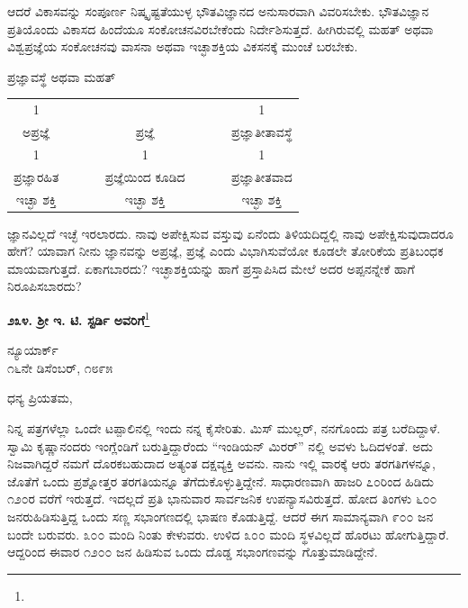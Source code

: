 ಆದರೆ ವಿಕಾಸವನ್ನು ಸಂಪೂರ್ಣ ನಿಷ್ಕೃಷ್ಟತೆಯುಳ್ಳ ಭೌತವಿಜ್ಞಾನದ ಅನುಸಾರವಾಗಿ ವಿವರಿಸಬೇಕು. ಭೌತವಿಜ್ಞಾನ ಪ್ರತಿಯೊಂದು ವಿಕಾಸದ ಹಿಂದೆಯೂ ಸಂಕೋಚನವಿರಬೇಕೆಂದು ನಿರ್ದೇಶಿಸುತ್ತದೆ. ಹೀಗಿರುವಲ್ಲಿ ಮಹತ್ ಅಥವಾ ವಿಶ್ವಪ್ರಜ್ಞೆಯ ಸಂಕೋಚನವು ವಾಸನಾ ಅಥವಾ ಇಚ್ಛಾಶಕ್ತಿಯ ವಿಕಸನಕ್ಕೆ ಮುಂಚೆ ಬರಬೇಕು.
\begin{center}
ಪ್ರಜ್ಞಾವಸ್ಥೆ ಅಥವಾ ಮಹತ್ 

\begin{tabular}{c@{$\;$}c@{$\;$}c}
1  & & 1\\
ಅಪ್ರಜ್ಞೆ & ಪ್ರಜ್ಞೆ & ಪ್ರಜ್ಞಾತೀತಾವಸ್ಥೆ \\
1 & 1 & 1 \\
ಪ್ರಜ್ಞಾರಹಿತ  & ~~ ~~ ಪ್ರಜ್ಞೆಯಿಂದ ಕೂಡಿದ ~~ ~~& ಪ್ರಜ್ಞಾತೀತವಾದ \\
ಇಚ್ಛಾ ಶಕ್ತಿ &  ಇಚ್ಛಾ ಶಕ್ತಿ &  ಇಚ್ಛಾ ಶಕ್ತಿ 
\end{tabular}
\end{center}

ಜ್ಞಾನವಿಲ್ಲದೆ ಇಚ್ಛೆ ಇರಲಾರದು. ನಾವು ಅಪೇಕ್ಷಿಸುವ ವಸ್ತುವು ಏನೆಂದು ತಿಳಿಯದಿದ್ದಲ್ಲಿ ನಾವು ಅಪೇಕ್ಷಿಸುವುದಾದರೂ ಹೇಗೆ? ಯಾವಾಗ ನೀನು ಜ್ಞಾನವನ್ನು ಅಪ್ರಜ್ಞೆ, ಪ್ರಜ್ಞೆ ಎಂದು ವಿಭಾಗಿಸುವೆಯೋ ಕೂಡಲೇ ತೋರಿಕೆಯ ಪ್ರತಿಬಂಧಕ ಮಾಯವಾಗುತ್ತದೆ. ಏಕಾಗಬಾರದು? ಇಚ್ಛಾಶಕ್ತಿಯನ್ನು ಹಾಗೆ ಪ್ರಸ್ತಾಪಿಸಿದ ಮೇಲೆ ಅದರ ಅಪ್ಪನನ್ನೇಕೆ ಹಾಗೆ ನಿರೂಪಿಸಬಾರದು?

\eject

\begin{center}
\textbf{೨೩೪. ಶ‍್ರೀ ಇ. ಟಿ. ಸ್ಟರ್ಡಿ ಅವರಿಗೆ}\footnote{}
\end{center}

\vspace{-0.7cm}

\begin{flushright}
ನ್ಯೂಯಾರ್ಕ್\\೧೬ನೇ ಡಿಸೆಂಬರ್, ೧೮೯೫
\end{flushright}

\vspace{-0.3cm}

\noindent
ಧನ್ಯ ಪ್ರಿಯತಮ,

ನಿನ್ನ ಪತ್ರಗಳೆಲ್ಲಾ ಒಂದೇ ಟಪ್ಪಾಲಿನಲ್ಲಿ ಇಂದು ನನ್ನ ಕೈಸೇರಿತು. ಮಿಸ್ ಮುಲ್ಲರ್, ನನಗೊಂದು ಪತ್ರ ಬರೆದಿದ್ದಾಳೆ. ಸ್ವಾಮಿ ಕೃಷ್ಣಾನಂದರು ಇಂಗ್ಲೆಂಡಿಗೆ ಬರುತ್ತಿದ್ದಾರೆಂದು “ಇಂಡಿಯನ್ ಮಿರರ್” ನಲ್ಲಿ ಅವಳು ಓದಿದಳಂತೆ. ಅದು ನಿಜವಾಗಿದ್ದರೆ ನಮಗೆ ದೊರಕಬಹುದಾದ ಅತ್ಯಂತ ದಕ್ಷವ್ಯಕ್ತಿ ಅವನು. ನಾನು ಇಲ್ಲಿ ವಾರಕ್ಕೆ ಆರು ತರಗತಿಗಳನ್ನೂ, ಜೊತೆಗೆ ಒಂದು ಪ್ರಶ್ನೋತ್ತರ ತರಗತಿಯನ್ನೂ ತೆಗೆದುಕೊಳ್ಳುತ್ತಿದ್ದೇನೆ. ಸಾಧಾರಣವಾಗಿ ಹಾಜರಿ ೭೦ರಿಂದ ಹಿಡಿದು ೧೨೦ರ ವರೆಗೆ ಇರುತ್ತದೆ. ಇದಲ್ಲದೆ ಪ್ರತಿ ಭಾನುವಾರ ಸಾರ್ವಜನಿಕ ಉಪನ್ಯಾಸವಿರುತ್ತದೆ. ಹೋದ ತಿಂಗಳು ೬೦೦ ಜನರುಹಿಡಿಸುತ್ತಿದ್ದ ಒಂದು ಸಣ್ಣ ಸಭಾಂಗಣದಲ್ಲಿ ಭಾಷಣ ಕೊಡುತ್ತಿದ್ದೆ. ಆದರೆ ಈಗ ಸಾಮಾನ್ಯವಾಗಿ ೯೦೦ ಜನ ಬಂದೇ ಬರುವರು. ೩೦೦ ಮಂದಿ ನಿಂತು ಕೇಳುವರು. ಉಳಿದ ೩೦೦ ಮಂದಿ ಸ್ಥಳವಿಲ್ಲದೆ ಹೊರಟು ಹೋಗುತ್ತಿದ್ದಾರೆ. ಆದ್ದರಿಂದ ಈವಾರ ೧೨೦೦ ಜನ ಹಿಡಿಸುವ ಒಂದು ದೊಡ್ಡ ಸಭಾಂಗಣವನ್ನು ಗೊತ್ತುಮಾಡಿದ್ದೇನೆ.

